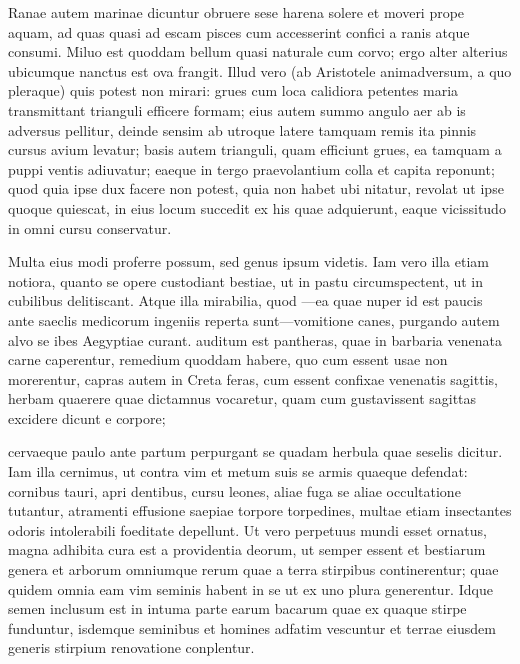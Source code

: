  Ranae autem marinae dicuntur obruere sese harena solere et moveri prope aquam, ad quas quasi ad escam pisces cum accesserint confici a ranis atque consumi. Miluo est quoddam bellum quasi naturale cum corvo; ergo alter alterius ubicumque nanctus est ova frangit. Illud vero (ab Aristotele animadversum, a quo pleraque) quis potest non mirari: grues cum loca calidiora petentes maria transmittant trianguli efficere formam; eius autem summo angulo aer ab is adversus pellitur, deinde sensim ab utroque latere tamquam remis ita pinnis cursus avium levatur; basis autem trianguli, quam efficiunt grues, ea tamquam a puppi ventis adiuvatur; eaeque in tergo praevolantium colla et capita reponunt; quod quia ipse dux facere non potest, quia non habet ubi nitatur, revolat ut ipse quoque quiescat, in eius locum succedit ex his quae adquierunt, eaque vicissitudo in omni cursu conservatur.

 Multa eius modi proferre possum, sed genus ipsum videtis. Iam vero illa etiam notiora, quanto se opere custodiant bestiae, ut in pastu circumspectent, ut in cubilibus delitiscant. Atque illa mirabilia, quod —ea quae nuper id est paucis ante saeclis medicorum ingeniis reperta sunt—vomitione canes, purgando autem alvo se ibes Aegyptiae curant. auditum est pantheras, quae in barbaria venenata carne caperentur, remedium quoddam habere, quo cum essent usae non morerentur, capras autem in Creta feras, cum essent confixae venenatis sagittis, herbam quaerere quae dictamnus vocaretur, quam cum gustavissent sagittas excidere dicunt e corpore;

 cervaeque paulo ante partum perpurgant se quadam herbula quae seselis dicitur. Iam illa cernimus, ut contra vim et metum suis se armis quaeque defendat: cornibus tauri, apri dentibus, cursu leones, aliae fuga se aliae occultatione tutantur, atramenti effusione saepiae torpore torpedines, multae etiam insectantes odoris intolerabili foeditate depellunt. Ut vero perpetuus mundi esset ornatus, magna adhibita cura est a providentia deorum, ut semper essent et bestiarum genera et arborum omniumque rerum quae a terra stirpibus continerentur; quae quidem omnia eam vim seminis habent in se ut ex uno plura generentur. Idque semen inclusum est in intuma parte earum bacarum quae ex quaque stirpe funduntur, isdemque seminibus et homines adfatim vescuntur et terrae eiusdem generis stirpium renovatione conplentur.

